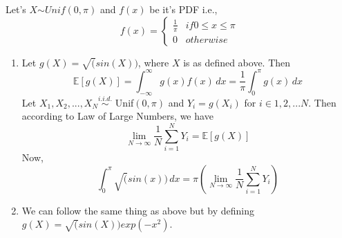 \documentclass{article}
\begin{document}
\begin{enumerate}
	\noindent %
    Let's $X \stackrel{}{\sim} Unif(0, \pi)$ and $f(x)$ be it's PDF i.e.,
    \begin{equation}
    \nonumber
    f(x) = \begin{cases}
        \frac{1}{\pi} & if 0 \le x \le \pi \\
        0 & otherwise
    \end{cases}
    \end{equation} 
        \begin{enumerate}
            \item Let $g(X) = \sqrt(sin(X))$, where $X$ is as defined above. Then 
                \begin{equation}
                    \mathbb{E}[g(X)] = \int_{-\infty}^{\infty}g(x)f(x) \,dx =  \frac{1}{\pi}\int_{0}^{\pi}g(x) \,dx
                \end{equation}
                Let $X_{1}, X_{2}, ..., X_{N} \stackrel{i.i.d.}{\sim}$ Unif$(0, \pi)$ and $Y_{i} = g(X_{i})$ for $i \in {1, 2, ... N}$. 
                Then according to Law of Large Numbers, we have 
                \begin{equation}
                    \nonumber
                    \lim_{N\to\infty} \frac{1}{N}\sum_{i=1}^{N}Y_{i} = \mathbb{E}[g(X)]
                \end{equation}
                Now,
                \begin{equation}
                    \int_{0}^{\pi}\sqrt(sin(x)) \,dx =  \pi \left ( \lim_{N\to\infty} \frac{1}{N}\sum_{i=1}^{N}Y_{i} \right )
                \end{equation}

            \item We can follow the same thing as above but by defining $g(X) = \sqrt(sin(X))exp(-x^{2})$. 
        \end{enumerate}

\end{enumerate}
\end{document}
